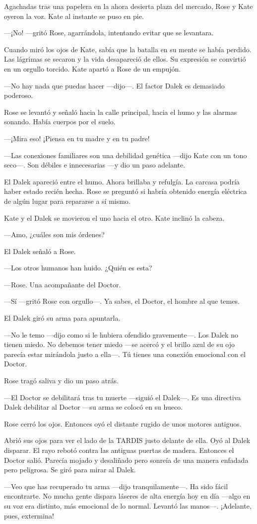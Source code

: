 Agachadas tras una papelera en la ahora desierta plaza del mercado, Rose
y Kate oyeron la voz. Kate al instante se puso en pie.

---¡No! ---gritó Rose, agarrándola, intentando evitar que se levantara.

Cuando miró los ojos de Kate, sabía que la batalla en su mente se había
perdido. Las lágrimas se secaron y la vida desapareció de ellos. Su
expresión se convirtió en un orgullo torcido. Kate apartó a Rose de un
empujón.

---No hay nada que puedas hacer ---dijo---. El factor Dalek es demasiado
poderoso.

Rose se levantó y señaló hacia la calle principal, hacia el humo y las
alarmas sonando. Había cuerpos por el suelo.

---¡Mira eso! ¡Piensa en tu madre y en tu padre!

---Las conexiones familiares son una debilidad genética ---dijo Kate con
un tono seco---. Son débiles e innecesarias ---y dio un paso adelante.

El Dalek apareció entre el humo. Ahora brillaba y refulgía. La carcasa
podría haber estado recién hecha. Rose se preguntó si habría obtenido
energía eléctrica de algún lugar para repararse a sí mismo.

Kate y el Dalek se movieron el uno hacia el otro. Kate inclinó la
cabeza.

---Amo, ¿cuáles son mis órdenes?

El Dalek señaló a Rose.

---Los otros humanos han huido. ¿Quién es esta?

---Rose. Una acompañante del Doctor.

---Sí ---gritó Rose con orgullo---. Ya sabes, el Doctor, el hombre al que
temes.

El Dalek giró su arma para apuntarla.

---No le temo ---dijo como si le hubiera ofendido gravemente---. Los Dalek
no tienen miedo. No debemos tener miedo ---se acercó y el brillo azul de
su ojo parecía estar mirándola justo a ella---. Tú tienes una conexión
emocional con el Doctor.

Rose tragó saliva y dio un paso atrás.

---El Doctor se debilitará tras tu muerte ---siguió el Dalek---. Es una
directiva Dalek debilitar al Doctor ---su arma se colocó en su hueco.

Rose cerró los ojos. Entonces oyó el distante rugido de unos motores
antiguos.

Abrió sus ojos para ver el lado de la TARDIS justo delante de ella. Oyó
al Dalek disparar. El rayo rebotó contra las antiguas puertas de madera.
Entonces el Doctor salió. Parecía mojado y desaliñado pero sonreía de
una manera enfadada pero peligrosa. Se giró para mirar al Dalek.

---Veo que has recuperado tu arma ---dijo tranquilamente---. Ha sido fácil
encontrarte. No mucha gente dispara láseres de alta energía hoy en día
---algo en su voz era distinto, más emocional de lo normal. Levantó las
manos---. ¡Adelante, pues, extermina!